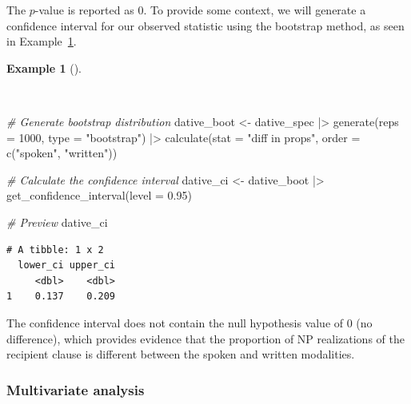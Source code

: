 \documentclass[
  letterpaper,
  krantz1]{latex/krantz-mod}
\newenvironment{Shaded}{\begin{snugshade}}{\end{snugshade}}
\newcommand{\AttributeTok}[1]{\textcolor[rgb]{0.00,0.00,0.00}{#1}}
\newcommand{\CommentTok}[1]{\textcolor[rgb]{0.00,0.00,0.00}{\textit{#1}}}
\newcommand{\DecValTok}[1]{\textcolor[rgb]{0.00,0.00,0.00}{#1}}
\newcommand{\FloatTok}[1]{\textcolor[rgb]{0.00,0.00,0.00}{#1}}
\newcommand{\FunctionTok}[1]{\textcolor[rgb]{0.00,0.00,0.00}{#1}}
\newcommand{\NormalTok}[1]{\textcolor[rgb]{0.00,0.00,0.00}{#1}}
\newcommand{\OtherTok}[1]{\textcolor[rgb]{0.00,0.00,0.00}{#1}}
\newcommand{\SpecialCharTok}[1]{\textcolor[rgb]{0.00,0.00,0.00}{#1}}
\newcommand{\StringTok}[1]{\textcolor[rgb]{0.00,0.00,0.00}{#1}}
\theoremstyle{definition}
\theoremstyle{definition}
\newtheorem{example}{Example}[chapter]
\theoremstyle{remark}
\begin{document}
The \(p\)-value is reported as \(0\). To provide some context, we will
generate a confidence interval for our observed statistic using the
bootstrap method, as seen in
Example~\ref{exm-infer-cat-confidence-interval-bivariate}.

\begin{example}[]\protect\hypertarget{exm-infer-cat-confidence-interval-bivariate}{}\label{exm-infer-cat-confidence-interval-bivariate}

~

\begin{Shaded}
\begin{Highlighting}[numbers=left,,]
\CommentTok{\# Generate bootstrap distribution}
\NormalTok{dative\_boot }\OtherTok{\textless{}{-}}
\NormalTok{  dative\_spec }\SpecialCharTok{|\textgreater{}}
  \FunctionTok{generate}\NormalTok{(}\AttributeTok{reps =} \DecValTok{1000}\NormalTok{, }\AttributeTok{type =} \StringTok{"bootstrap"}\NormalTok{) }\SpecialCharTok{|\textgreater{}}
  \FunctionTok{calculate}\NormalTok{(}\AttributeTok{stat =} \StringTok{"diff in props"}\NormalTok{, }\AttributeTok{order =} \FunctionTok{c}\NormalTok{(}\StringTok{"spoken"}\NormalTok{, }\StringTok{"written"}\NormalTok{))}

\CommentTok{\# Calculate the confidence interval}
\NormalTok{dative\_ci }\OtherTok{\textless{}{-}}
\NormalTok{  dative\_boot }\SpecialCharTok{|\textgreater{}}
  \FunctionTok{get\_confidence\_interval}\NormalTok{(}\AttributeTok{level =} \FloatTok{0.95}\NormalTok{)}

\CommentTok{\# Preview}
\NormalTok{dative\_ci}
\end{Highlighting}
\end{Shaded}

\end{example}

\vspace{3em}

\begin{verbatim}
# A tibble: 1 x 2
  lower_ci upper_ci
     <dbl>    <dbl>
1    0.137    0.209
\end{verbatim}

The confidence interval does not contain the null hypothesis value of 0
(no difference), which provides evidence that the proportion of NP
realizations of the recipient clause is different between the spoken and
written modalities.

\subsubsection{Multivariate analysis}\label{multivariate-analysis}
\end{document}
